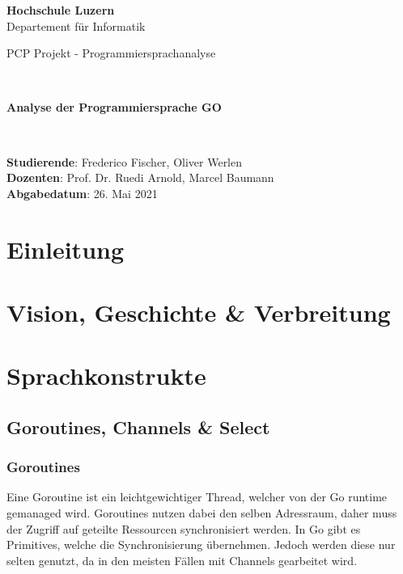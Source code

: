 \documentclass[12pt,titlepage]{article}
\begin{document}
\thispagestyle{empty}

\begin{center}
\textbf{Hochschule Luzern}\\
Departement für Informatik\\[12\baselineskip]

\begin{Huge}
PCP Projekt - Programmiersprachanalyse
\end{Huge} \\[6\baselineskip]

\begin{large}
\textbf{Analyse der Programmiersprache GO}
\end{large} \\[6\baselineskip]

\begin{large}
\textbf{Studierende}: Frederico Fischer, Oliver Werlen\\
\textbf{Dozenten}: Prof. Dr. Ruedi Arnold, Marcel Baumann \\

\textbf{Abgabedatum}: 26. Mai 2021 \\
\end{large}
\end{center}
\newpage


\section{Einleitung}

\section{Vision, Geschichte \& Verbreitung}

\section{Sprachkonstrukte}
    
\subsection{Goroutines, Channels \& Select}
\subsubsection{Goroutines}
Eine Goroutine ist ein leichtgewichtiger Thread, welcher von der Go runtime gemanaged wird. Goroutines nutzen dabei den selben Adressraum, daher muss der Zugriff auf geteilte Ressourcen synchronisiert werden. In Go gibt es Primitives, welche die Synchronisierung übernehmen. Jedoch werden diese nur selten genutzt, da in den meisten Fällen mit Channels gearbeitet wird. 
\end{document}
